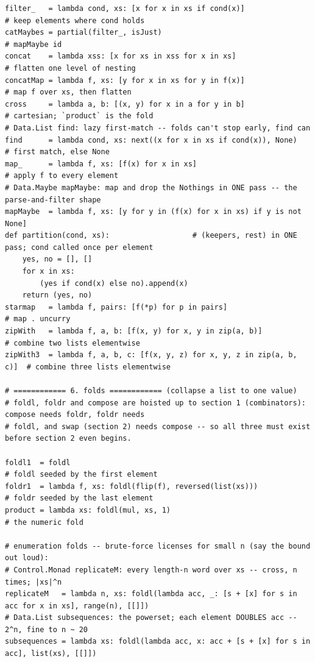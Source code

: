 \documentclass[11pt,letterpaper]{book}
\begin{document}
\begin{lstlisting}[style=file]
filter_   = lambda cond, xs: [x for x in xs if cond(x)]               # keep elements where cond holds
catMaybes = partial(filter_, isJust)                                  # mapMaybe id
concat    = lambda xss: [x for xs in xss for x in xs]                 # flatten one level of nesting
concatMap = lambda f, xs: [y for x in xs for y in f(x)]               # map f over xs, then flatten
cross     = lambda a, b: [(x, y) for x in a for y in b]               # cartesian; `product` is the fold
# Data.List find: lazy first-match -- folds can't stop early, find can
find      = lambda cond, xs: next((x for x in xs if cond(x)), None)   # first match, else None
map_      = lambda f, xs: [f(x) for x in xs]                          # apply f to every element
# Data.Maybe mapMaybe: map and drop the Nothings in ONE pass -- the parse-and-filter shape
mapMaybe  = lambda f, xs: [y for y in (f(x) for x in xs) if y is not None]
def partition(cond, xs):                   # (keepers, rest) in ONE pass; cond called once per element
    yes, no = [], []
    for x in xs:
        (yes if cond(x) else no).append(x)
    return (yes, no)
starmap   = lambda f, pairs: [f(*p) for p in pairs]                   # map . uncurry
zipWith   = lambda f, a, b: [f(x, y) for x, y in zip(a, b)]           # combine two lists elementwise
zipWith3  = lambda f, a, b, c: [f(x, y, z) for x, y, z in zip(a, b, c)]  # combine three lists elementwise

# ============ 6. folds ============ (collapse a list to one value)
# foldl, foldr and compose are hoisted up to section 1 (combinators): compose needs foldr, foldr needs
# foldl, and swap (section 2) needs compose -- so all three must exist before section 2 even begins.

foldl1  = foldl                                                         # foldl seeded by the first element
foldr1  = lambda f, xs: foldl(flip(f), reversed(list(xs)))              # foldr seeded by the last element
product = lambda xs: foldl(mul, xs, 1)                                  # the numeric fold

# enumeration folds -- brute-force licenses for small n (say the bound out loud):
# Control.Monad replicateM: every length-n word over xs -- cross, n times; |xs|^n
replicateM   = lambda n, xs: foldl(lambda acc, _: [s + [x] for s in acc for x in xs], range(n), [[]])
# Data.List subsequences: the powerset; each element DOUBLES acc -- 2^n, fine to n ~ 20
subsequences = lambda xs: foldl(lambda acc, x: acc + [s + [x] for s in acc], list(xs), [[]])


\end{lstlisting}
\end{document}
